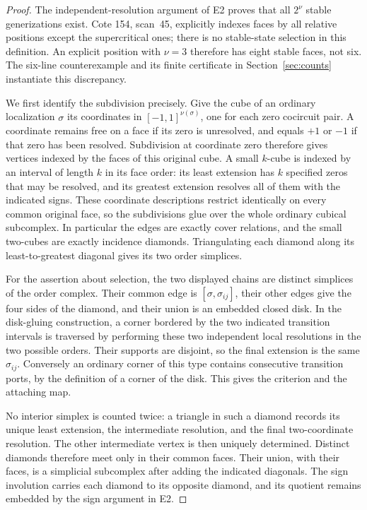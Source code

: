 \begin{proof}
The independent-resolution argument of E2 proves that all $2^\nu$ stable
generizations exist. Cote 154, scan~45, explicitly indexes faces by all
relative positions except the supercritical ones; there is no stable-state
selection in this definition. An explicit position with $\nu=3$ therefore
has eight stable faces, not six. The six-line counterexample and its finite
certificate in Section~\ref{sec:counts} instantiate this discrepancy.

We first identify the subdivision precisely. Give the cube of an ordinary
localization $\sigma$ its coordinates in $[-1,1]^{\nu(\sigma)}$, one for
each zero cocircuit pair. A coordinate remains free on a face if its
zero is unresolved, and equals $+1$ or $-1$ if that zero has been
resolved. Subdivision at coordinate zero therefore gives vertices
indexed by the faces of this original cube. A small $k$-cube is indexed
by an interval of length $k$ in its face order: its least extension has
$k$ specified zeros that may be resolved, and its greatest extension
resolves all of them with the indicated signs. These coordinate
descriptions restrict identically on every common original face, so
the subdivisions glue over the whole ordinary cubical subcomplex.
In particular the edges are exactly cover relations, and the small
two-cubes are exactly incidence diamonds. Triangulating each diamond
along its least-to-greatest diagonal gives its two order simplices.

For the assertion about selection, the two displayed chains are distinct
simplices of the order complex. Their common edge is
$[\sigma,\sigma_{ij}]$, their other edges give the four sides of the
diamond, and their union is an embedded closed disk. In the disk-gluing
construction, a corner bordered by the two indicated transition intervals
is traversed by performing these two independent local resolutions in the
two possible orders. Their supports are disjoint, so the final extension
is the same $\sigma_{ij}$. Conversely an ordinary corner of this type
contains consecutive transition ports, by the definition of a corner of
the disk. This gives the criterion and the attaching map.

No interior simplex is counted twice: a triangle in such a diamond records
its unique least extension, the intermediate resolution, and the final
two-coordinate resolution. The other intermediate vertex is then uniquely
determined. Distinct diamonds therefore meet only in their common faces.
Their union, with their faces, is a simplicial subcomplex after adding the
indicated diagonals. The sign involution carries each diamond to its
opposite diamond, and its quotient remains embedded by the sign argument
in E2.


\end{proof}
